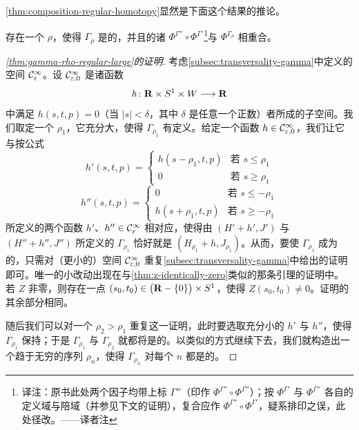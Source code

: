\cref{thm:composition-regular-homotopy}显然是下面这个结果的推论。

\begin{proposition}\label{thm:exists-rho-coincide}
存在一个 $\rho$，使得 $\Gamma_{\rho}$ 是\trRegular{}的，并且\trComplex{}的诸\trMorphism{} $\Phi^{\Gamma''}\circ\Phi^{\Gamma'}$\footnote{译注：原书此处两个因子均带上标 $\Gamma''$（印作 $\Phi^{\Gamma''}\circ\Phi^{\Gamma''}$）；按 $\Phi^{\Gamma'}$ 与 $\Phi^{\Gamma''}$ 各自的定义域与陪域（并参见下文的证明），复合应作 $\Phi^{\Gamma''}\circ\Phi^{\Gamma'}$，疑系排印之误，此处径改。——译者注}与 $\Phi^{\Gamma_{\rho}}$ 相重合。
\end{proposition}

\begin{proof}[\cref{thm:gamma-rho-regular-large}的证明]
考虑\cref{subsec:transversality-gamma}中定义的空间 $\mathcal{C}^{\infty}_{\varepsilon}$。设 $\mathcal{C}^{\infty}_{\varepsilon,0}$ 是诸函数
\[
h\colon\mathbf{R}\times S^{1}\times W\longrightarrow\mathbf{R}
\]
中满足 $h(s,t,p)=0$（当 $|s|<\delta$，其中 $\delta$ 是任意一个正数）者所成的子空间。我们取定一个 $\rho_{1}$，它充分大，使得 $\Gamma_{\rho_{1}}$ 有定义。给定一个函数 $h\in\mathcal{C}^{\infty}_{\varepsilon,0}$，我们让它与按公式
\[
h'(s,t,p)=
\left\{\begin{array}{ll}
h(s-\rho_{1},t,p) & \text{若 } s\le\rho_{1}\\
0 & \text{若 } s\ge\rho_{1}
\end{array}\right.
\]
\[
h''(s,t,p)=
\left\{\begin{array}{ll}
0 & \text{若 } s\le-\rho_{1}\\
h(s+\rho_{1},t,p) & \text{若 } s\ge-\rho_{1}
\end{array}\right.
\]
所定义的两个函数 $h'$、$h''\in\mathcal{C}^{\infty}_{\varepsilon}$ 相对应，使得由 $(H'+h',J')$ 与 $(H''+h'',J'')$ 所定义的\trHomotopy{} $\Gamma_{\rho_{1}}$ 恰好就是 $(H_{\rho_{1}}+h,J_{\rho_{1}})$。从而，要使 $\Gamma_{\rho_{1}}$ 成为\trRegular{}的，只需对（更小的）\trPerturbation{}空间 $\mathcal{C}^{\infty}_{\varepsilon,0}$ 重复\cref{subsec:transversality-gamma}中给出的\trTransversality{}证明即可。唯一的小改动出现在与\cref{thm:z-identically-zero}类似的那条引理的证明中。若\trVectorField{} $Z$ 非零，则存在一点 $(s_{0},t_{0})\in\bigl(\mathbf{R}-\{0\}\bigr)\times S^{1}$，使得 $Z(s_{0},t_{0})\ne0$。证明的其余部分相同。

随后我们可以对一个 $\rho_{2}>\rho_{1}$ 重复这一证明，此时要选取充分小的\trPerturbation{} $h'$ 与 $h''$，使得 $\Gamma_{\rho_{1}}$ 保持\trRegular{}；于是 $\Gamma_{\rho_{1}}$ 与 $\Gamma_{\rho_{2}}$ 就都将是\trRegular{}的。以类似的方式继续下去，我们就构造出一个趋于无穷的序列 $\rho_{n}$，使得 $\Gamma_{\rho_{n}}$ 对每个 $n$ 都是\trRegular{}的。
\end{proof}

